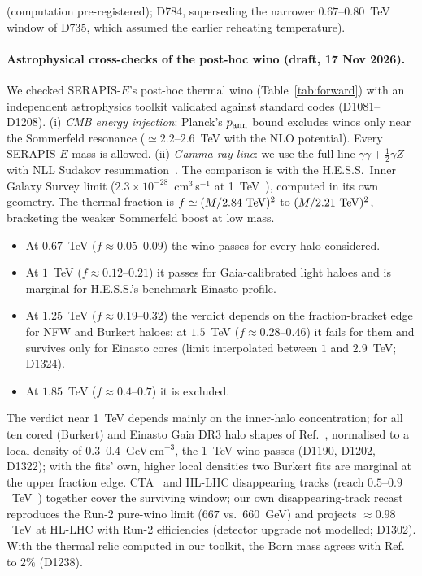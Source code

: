 \documentclass[aps,prd,twocolumn,superscriptaddress,nofootinbib,floatfix]{revtex4-2}
\begin{document}
(computation pre-registered); D784, superseding the narrower $0.67$--$0.80$~TeV window of D735, which assumed the earlier reheating temperature).

\paragraph{Astrophysical cross-checks of the post-hoc wino (draft, 17 Nov 2026).} We checked SERAPIS-$E$'s post-hoc thermal wino (Table~\ref{tab:forward}) with an independent astrophysics toolkit validated against standard codes (D1081--D1208).
(i) \emph{CMB energy injection}: Planck's $p_{\rm ann}$ bound excludes winos only near the Sommerfeld resonance ($\simeq2.2$--$2.6$~TeV with the NLO potential). Every SERAPIS-$E$ mass is allowed.
(ii) \emph{Gamma-ray line}: we use the full line $\gamma\gamma+\tfrac12\gamma Z$ with NLL Sudakov resummation~\cite{arXiv_1409_8294}. The comparison is with the H.E.S.S.\ Inner Galaxy Survey limit ($2.3\times10^{-28}$~cm$^3$\,s$^{-1}$ at 1~TeV~\cite{arXiv_2608_07234}), computed in its own geometry. The thermal fraction is $f\simeq(M/2.84~{\rm TeV})^2$ to $(M/2.21~{\rm TeV})^2$, bracketing the weaker Sommerfeld boost at low mass.
\begin{itemize}
\item At $0.67$~TeV ($f\approx0.05$--$0.09$) the wino passes for every halo considered.
\item At $1$~TeV ($f\approx0.12$--$0.21$) it passes for Gaia-calibrated light haloes and is marginal for H.E.S.S.'s benchmark Einasto profile.
\item At $1.25$~TeV ($f\approx0.19$--$0.32$) the verdict depends on the fraction-bracket edge for NFW and Burkert haloes; at $1.5$~TeV ($f\approx0.28$--$0.46$) it fails for them and survives only for Einasto cores (limit interpolated between $1$ and $2.9$~TeV; D1324).
\item At $1.85$~TeV ($f\approx0.4$--$0.7$) it is excluded.
\end{itemize}
The verdict near 1~TeV depends mainly on the inner-halo concentration; for all ten cored (Burkert) and Einasto Gaia DR3 halo shapes of Ref.~\cite{arXiv_2605_16994}, normalised to a local density of $0.3$--$0.4$~GeV\,cm$^{-3}$, the 1~TeV wino passes (D1190, D1202, D1322); with the fits' own, higher local densities two Burkert fits are marginal at the upper fraction edge. CTA~\cite{arXiv_2008_00692} and HL-LHC disappearing tracks (reach $0.5$--$0.9$~TeV~\cite{arXiv_1805_00015}) together cover the surviving window; our own disappearing-track recast reproduces the Run-2 pure-wino limit ($667$ vs.\ $660$~GeV) and projects $\approx0.98$~TeV at HL-LHC with Run-2 efficiencies (detector upgrade not modelled; D1302). With the thermal relic computed in our toolkit, the Born mass agrees with Ref.~\cite{arXiv_2009_00640} to $2\%$ (D1238).
\end{document}

